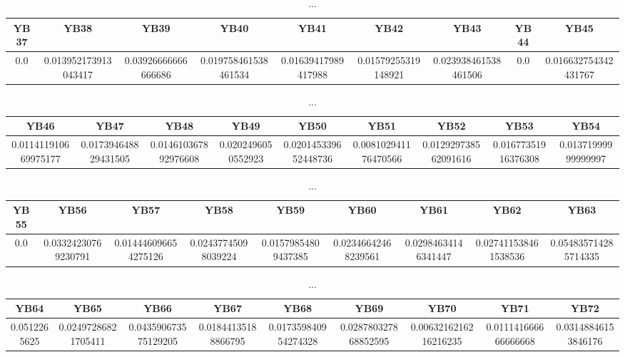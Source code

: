 \documentclass[]{article}
\begin{document}
\begin{table}[h]
      \centering
      \begin{tabular}{|c|c|c|c|c|c|c|c|c|}
            \hline
            YB37 & YB38                 & YB39                & YB40                 & YB41                & YB42                & YB43                 & YB44 & YB45                 \\
            \hline
            0.0  & 0.013952173913043417 & 0.03926666666666686 & 0.019758461538461534 & 0.01639417989417988 & 0.01579255319148921 & 0.023938461538461506 & 0.0  & 0.016632754342431767 \\
            \hline
      \end{tabular}
      \caption{...}
\end{table}
\begin{table}[h]
      \centering
      \begin{tabular}{|c|c|c|c|c|c|c|c|c|}
            \hline
            YB46                 & YB47                 & YB48                 & YB49               & YB50                 & YB51                 & YB52                 & YB53                & YB54                \\
            \hline
            0.011411910669975177 & 0.017394648829431505 & 0.014610367892976608 & 0.0202496050552923 & 0.020145339652448736 & 0.008102941176470566 & 0.012929738562091616 & 0.01677351916376308 & 0.01371999999999997 \\
            \hline
      \end{tabular}
      \caption{...}
\end{table}
\begin{table}[h]
      \centering
      \begin{tabular}{|c|c|c|c|c|c|c|c|c|}
            \hline
            YB55 & YB56                & YB57                 & YB58                & YB59                & YB60                & YB61                & YB62                 & YB63                 \\
            \hline
            0.0  & 0.03324230769230791 & 0.014446096654275126 & 0.02437745098039224 & 0.01579854809437385 & 0.02346642468239561 & 0.02984634146341447 & 0.027411538461538536 & 0.054835714285714335 \\
            \hline
      \end{tabular}
      \caption{...}
\end{table}
\begin{table}[h]
      \centering
      \begin{tabular}{|c|c|c|c|c|c|c|c|c|}
            \hline
            YB64         & YB65                & YB66                 & YB67                & YB68                 & YB69                 & YB70                  & YB71                 & YB72                \\
            \hline
            0.0512265625 & 0.02497286821705411 & 0.043590673575129205 & 0.01844135188866795 & 0.017359840954274328 & 0.028780327868852595 & 0.0063216216216216235 & 0.011141666666666668 & 0.03148846153846176 \\
            \hline
      \end{tabular}
      \caption{...}
\end{table}
\end{document}
